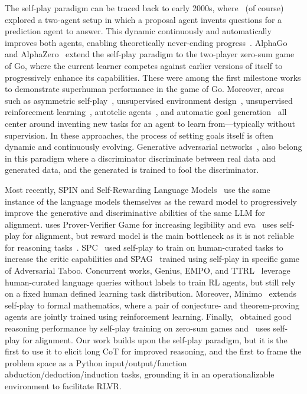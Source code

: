 \documentclass{article}
\begin{document}
The self-play paradigm can be traced back to early 2000s, where~\citet{schmidhuber2003exploring,schmidhuber2013powerplay} (of course) explored a two-agent setup in which a proposal agent invents questions for a prediction agent to answer. This dynamic continuously and automatically improves both agents, enabling theoretically never-ending progress~\citep{schaul2024boundless}. AlphaGo and AlphaZero~\citep{silver2016mastering,silver2017mastering} extend the self-play paradigm to the two-player zero-sum game of Go, where the current learner competes against earlier versions of itself to progressively enhance its capabilities. These were among the first milestone works to demonstrate superhuman performance in the game of Go. Moreover, areas such as asymmetric self-play~\citep{sukhbaatar2017intrinsic,openai2021asymmetric}, unsupervised environment design~\citep{wang2019paired,dennis2020emergent}, unsupervised reinforcement learning~\citep{laskin2021urlb,zhao2022mixture,zhao2025self}, autotelic agents~\citep{colas2022language,colas2022autotelic,haluptzok2022language}, and automatic goal generation~\citep{florensa2018automatic} all center around inventing new tasks for an agent to learn from—typically without supervision. In these approaches, the process of setting goals itself is often dynamic and continuously evolving. Generative adversarial networks~\citep{goodfellow2020generative}, also belong in this paradigm where a discriminator discriminate between real data and generated data, and the generated is trained to fool the discriminator.

Most recently, SPIN and Self-Rewarding Language Models~\citep{chen2024self,yuan2401self} use the same instance of the language models themselves as the reward model to progressively improve the generative and discriminative abilities of the same LLM for alignment. \cite{kirchner2024prover} uses Prover-Verifier Game for increasing legibility and eva~\citep{DBLP:journals/corr/abs-2411-00062} uses self-play for alignment, but reward model is the main bottleneck as it is not reliable for reasoning tasks~\citep{lambert2024t}. SPC~\cite{chen2025spcevolvingselfplaycritic} used self-play to train on human-curated tasks to increase the critic capabilities and SPAG~\cite{DBLP:conf/nips/ChengHXZDHDL24} trained using self-play in specific game of Adversarial Taboo. Concurrent works, Genius, EMPO, and TTRL~\citep{xu2025geniusgeneralizablepurelyunsupervised, zhang2025rightquestionhalfanswer, zuo2025ttrltesttimereinforcementlearning} leverage human-curated language queries without labels to train RL agents, but still rely on a fixed human defined learning task distribution. Moreover, Minimo~\citep{poesia2024learning} extends self-play to formal mathematics, where a pair of conjecture- and theorem-proving agents are jointly trained using reinforcement learning. Finally,~\citep{liu2025spiral} obtained good reasoning performance by self-play training on zero-sum games and~\citep{liu2025chasing} uses self-play for alignment. Our work builds upon the self-play paradigm, but it is the first to use it to elicit long CoT for improved reasoning, and the first to frame the problem space as a Python input/output/function abduction/deduction/induction tasks, grounding it in an operationalizable environment to facilitate RLVR.
\end{document}
